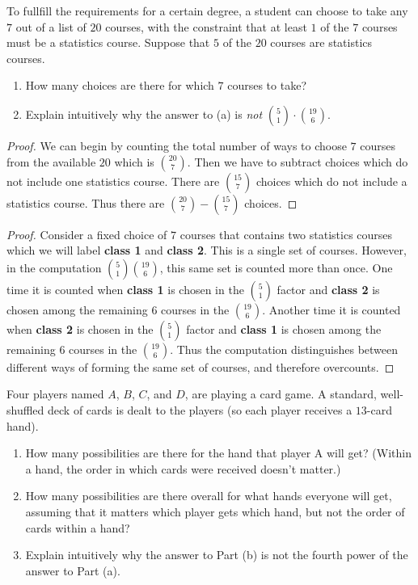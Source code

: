 \begin{tcolorbox}[title=Problem 10, breakable]
    To fullfill the requirements for a certain degree, a student can 
    choose to take any $7$ out of a list of $20$ courses,
    with the constraint that at least $1$ of the $7$ courses 
    must be a statistics course. Suppose that $5$ of the $20$ courses are 
    statistics courses. 
    \begin{enumerate}
        \item How many choices are there for which $7$ courses to take?
        \item Explain intuitively why the answer to (a) is \emph{not} $\binom{5}{1} \cdot \binom{19}{6}$.
    \end{enumerate}
\end{tcolorbox}

\begin{proof}
    We can begin by counting the total number of ways to choose $7$ courses from the 
        available $20$ which is $\binom{20}{7}$.
    Then we have to subtract choices which do not include one statistics course.
    There are $\binom{15}{7}$ choices which do not include a statistics course.
    Thus there are $\binom{20}{7} - \binom{15}{7}$ choices.
\end{proof}

\begin{proof}
    Consider a fixed choice of $7$ courses that contains two statistics courses
    which we will label \textbf{class 1} and \textbf{class 2}. This is a single set of courses.
    However, in the computation $\binom{5}{1}\binom{19}{6}$, this same set is counted
    more than once. One time it is counted when \textbf{class 1} is chosen in the
    $\binom{5}{1}$ factor and \textbf{class 2} is chosen among the remaining $6$
    courses in the $\binom{19}{6}$. Another time it is counted when \textbf{class 2}
    is chosen in the $\binom{5}{1}$ factor and \textbf{class 1} is chosen among the
    remaining $6$ courses in the $\binom{19}{6}$.
    Thus the computation distinguishes between different ways of forming the same
    set of courses, and therefore overcounts.
\end{proof}

\begin{tcolorbox}[title=Problem 12, breakable]
    Four players named $A$, $B$, $C$, and $D$, are playing a card game.
    A standard, well-shuffled deck of cards is dealt to the players (so each 
    player receives a $13$-card hand).
    \begin{enumerate}
        \item How many possibilities are there for the hand that player A will get?
        (Within a hand, the order in which cards were received doesn't matter.)
        \item How many possibilities are there overall for what hands everyone will get,
              assuming that it matters which player gets which hand, but not the order 
              of cards within a hand?
        \item Explain intuitively why the answer to Part (b) is not the fourth power 
               of the answer to Part (a).
    \end{enumerate}
\end{tcolorbox}

